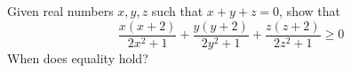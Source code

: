 Given real numbers $x,y,z$ such that $x+y+z=0$, show that
\[\dfrac{x(x+2)}{2x^2+1}+\dfrac{y(y+2)}{2y^2+1}+\dfrac{z(z+2)}{2z^2+1}\ge 0\]
When does equality hold?